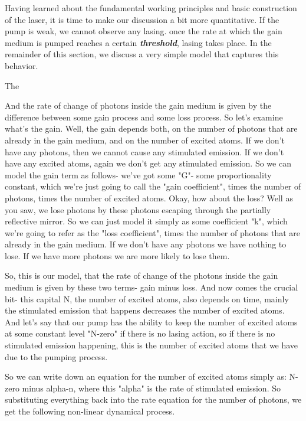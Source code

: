 Having learned about the fundamental working principles and basic construction of the laser, it is time to make our discussion a bit more quantitative.
If the pump is weak, we cannot observe any lasing.
once the rate at which the gain medium is pumped reaches a certain \textit{\textbf{threshold}}, lasing takes place.
In the remainder of this section, we discuss a very simple model that captures this behavior.

The 

And the rate of change of photons inside the gain medium is given by the difference between some gain process and some loss process. So let's examine what's the gain. Well, the gain depends both, on the number of photons that are already in the gain medium, and on the number of excited atoms. If we don't have any photons, then we cannot cause any stimulated emission. If we don't have any excited atoms, again we don't get any stimulated emission. So we can model the gain term as follows- we've got some "G"- some proportionality constant, which we're just going to call the "gain coefficient", times the number of photons, times the number of excited atoms. Okay, how about the loss? Well as you saw, we lose photons by these photons escaping through the partially reflective mirror. So we can just model it simply as some coefficient "k", which we're going to refer as the "loss coefficient", times the number of photons that are already in the gain medium. If we don't have any photons we have nothing to lose. If we have more photons we are more likely to lose them.

So, this is our model, that the rate of change of the photons inside the gain medium is given by these two terms- gain minus loss. And now comes the crucial bit- this capital N, the number of excited atoms, also depends on time, mainly the stimulated emission that happens decreases the number of excited atoms. And let's say that our pump has the ability to keep the number of excited atoms at some constant level "N-zero" if there is no lasing action, so if there is no stimulated emission happening, this is the number of excited atoms that we have due to the pumping process.

So we can write down an equation for the number of excited atoms simply as: N-zero minus alpha-n, where this "alpha" is the rate of stimulated emission. So substituting everything back into the rate equation for the number of photons, we get the following non-linear dynamical process.

